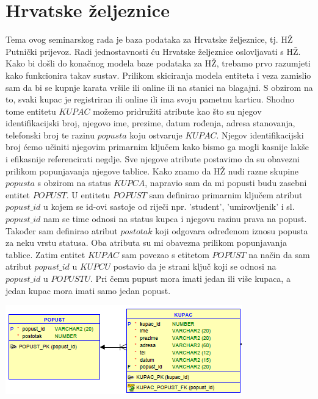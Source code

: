 \documentclass{OM_style}
\begin{document}
\pagestyle{OM_lecture}

\chapter{Hrvatske željeznice} %

Tema ovog seminarskog rada je baza podataka za Hrvatske željeznice, tj. HŽ Putnički prijevoz. Radi jednostavnosti ću Hrvatske željeznice oslovljavati s HŽ. Kako bi došli do konačnog modela baze podataka za HŽ, trebamo prvo razumjeti kako funkcionira takav sustav. Prilikom skiciranja modela entiteta i veza zamislio sam da bi se kupnje karata vršile ili online ili na stanici na blagajni. S obzirom na to, svaki kupac je registriran ili online ili ima svoju pametnu karticu. Shodno tome entitetu $KUPAC$ možemo pridružiti atribute kao što su njegov identifikacijski broj, njegovo ime, prezime, datum rođenja, adresa stanovanja, telefonski broj te razinu $popusta$ koju ostvaruje $KUPAC$. Njegov identifikacijski broj ćemo učiniti njegovim primarnim ključem kako bismo ga mogli kasnije lakše i efikasnije referencirati negdje. Sve njegove atribute postavimo da su obavezni prilikom popunjavanja njegove tablice. Kako znamo da HŽ nudi razne skupine $popusta$ s obzirom na status $KUPCA$, napravio sam da mi popusti budu zasebni entitet $POPUST$. U entitetu $POPUST$ sam definirao primarnim ključem atribut $popust\_id$ u kojem se id-ovi sastoje od riječi npr. 'student', 'umirovljenik' i sl. $popust\_id$ nam se time odnosi na status kupca i njegovu razinu prava na popust. Također sam definirao atribut $postotak$ koji odgovara određenom iznosu popusta za neku vrstu statusa. Oba atributa su mi obavezna prilikom popunjavanja tablice. Zatim entitet $KUPAC$ sam povezao s etitetom $POPUST$ na način da sam atribut $popust\_id$ u $KUPCU$ postavio da je strani ključ koji se odnosi na $popust\_id$ u $POPUSTU$. Pri čemu pupust mora imati jedan ili više kupaca, a jedan kupac mora imati samo jedan popust.

\phantom{................} \includegraphics{popustkupac} \\
\end{document}
